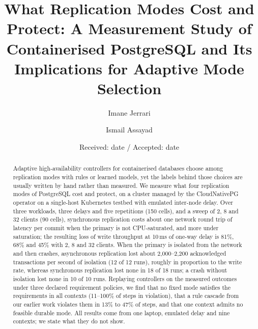 \documentclass[smallextended]{svjour3}
\begin{document}
\title{What Replication Modes Cost and Protect: A Measurement Study of Containerised PostgreSQL and Its Implications for Adaptive Mode Selection}
\author{Imane Jerrari \and Ismail Assayad}
\date{Received: date / Accepted: date}
\maketitle
\begin{abstract}
Adaptive high-availability controllers for containerised databases choose among replication modes with rules or learned models, yet the labels behind those choices are usually written by hand rather than measured. We measure what four replication modes of PostgreSQL cost and protect, on a cluster managed by the CloudNativePG operator on a single-host Kubernetes testbed with emulated inter-node delay. Over three workloads, three delays and five repetitions (150 cells), and a sweep of 2, 8 and 32 clients (90 cells), synchronous replication costs about one network round trip of latency per commit when the primary is not CPU-saturated, and more under saturation; the resulting loss of write throughput at 10\,ms of one-way delay is 81\%, 68\% and 45\% with 2, 8 and 32 clients. When the primary is isolated from the network and then crashes, asynchronous replication lost about 2,000--2,200 acknowledged transactions per second of isolation (12 of 12 runs), roughly in proportion to the write rate, whereas synchronous replication lost none in 18 of 18 runs; a crash without isolation lost none in 10 of 10 runs. Replaying controllers on the measured outcomes under three declared requirement policies, we find that no fixed mode satisfies the requirements in all contexts (11--100\% of steps in violation), that a rule cascade from our earlier work violates them in 13\% to 47\% of steps, and that one context admits no feasible durable mode. All results come from one laptop, emulated delay and nine contexts; we state what they do not show.
\end{abstract}
\end{document}
